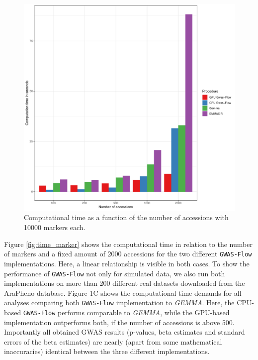 \begin{figure}[H]
\centering
\includegraphics[height=.55\textheight, width=1.1\textwidth]{Figures/comp_time_gwas}
\decoRule
\caption[Computations time vs accessions]{Computational time as a function of the number of accessions with 10000 markers each.}
\label{fig:time_accessions}
\end{figure}

Figure \ref{fig:time_marker} shows the computational time in relation to the number of markers and a fixed amount
of 2000 accessions for the two different \texttt{GWAS-Flow} implementations. Here, a linear relationship is
visible in both cases. To show the performance of \texttt{GWAS-Flow} not only for simulated data, we also run
both implementations on more than 200 different real datasets downloaded from the AraPheno database. Figure 1C
shows the computational time demands for all analyses comparing both \texttt{GWAS-Flow} implementation to
\textit{GEMMA}. Here, the CPU-based \texttt{GWAS-Flow} performs comparable to \textit{GEMMA}, while the
GPU-based implementation outperforms both, if the number of accessions is above 500. Importantly all obtained
GWAS results (p-values, beta estimates and standard errors of the beta estimates) are nearly (apart from some
mathematical inaccuracies) identical between the three different implementations.

